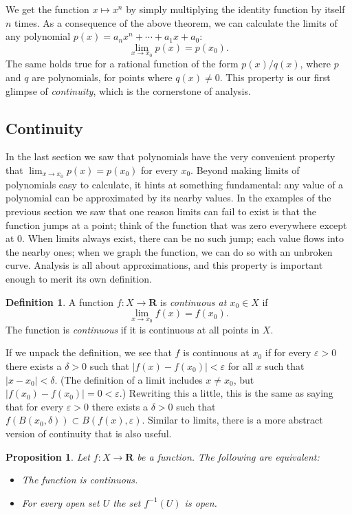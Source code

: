 \documentclass[11pt]{article}
\newtheorem{prop}[theo]{Proposition}
\theoremstyle{definition}
\newtheorem{defi}[theo]{Definition}
\def\eps{\varepsilon}
\def\RR{\mathbf{R}}
\begin{document}
We get the function $x \mapsto x^n$ by simply multiplying the identity function
by itself $n$ times.
As a consequence of the above theorem, we can calculate the limits of
any polynomial $p(x) = a_n x^n + \cdots + a_1 x + a_0$:
\[
\lim_{x \to x_0} p(x) = p(x_0).
\]
The same holds true for a rational function of the form $p(x) / q(x)$, where $p$
and $q$ are polynomials, for points where $q(x) \not= 0$.
This property is our first glimpse of \emph{continuity}, which is the cornerstone
of analysis.



\subsection{Continuity}


In the last section we saw that polynomials have the very convenient property
that $\lim_{x \to x_0} p(x) = p(x_0)$ for every $x_0$.
Beyond making limits of polynomials easy to calculate, it hints at something
fundamental: any value of a polynomial can be approximated by its nearby values.
In the examples of the previous section we saw that one reason limits can fail
to exist is that the function jumps at a point; think of the function that was
zero everywhere except at $0$.
When limits always exist, there can be no such jump; each value flows into the
nearby ones; when we graph the function, we can do so with an unbroken curve.
Analysis is all about approximations, and this property is important enough to
merit its own definition.


\begin{defi}
A function $f : X \to \RR$ is \emph{continuous at $x_0 \in X$} if 
\[
\lim_{x \to x_0} f(x) = f(x_0).
\]
The function is \emph{continuous} if it is continuous at all points in $X$.
\end{defi}

If we unpack the definition, we see that $f$ is continuous at $x_0$ if for
every $\eps > 0$ there exists a $\delta > 0$ such that $|f(x) - f(x_0)| < \eps$
for all $x$ such that $|x - x_0| < \delta$.
(The definition of a limit includes $x \not= x_0$, but $|f(x_0) - f(x_0)| = 0 <
\eps$.)
Rewriting this a little, this is the same as saying that for every $\eps > 0$
there exists a $\delta > 0$ such that $f(B(x_0, \delta)) \subset B(f(x), \eps)$.
Similar to limits, there is a more abstract version of continuity that is also
useful.


\begin{prop}
Let $f : X \to \RR$ be a function.
The following are equivalent:
\begin{itemize}
\item
The function is continuous.

\item
For every open set $U$ the set $f^{-1}(U)$ is open.
\end{itemize}
\end{prop}
\end{document}
